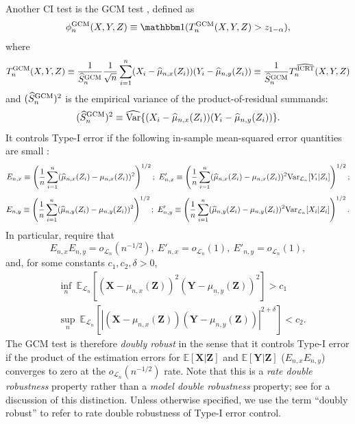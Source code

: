 \documentclass[aos]{imsart}
\theoremstyle{plain}
\theoremstyle{remark}
\newcommand{\E}{\mathbb E}								%
\newcommand{\V}{\mathrm{Var}}							%
\newcommand{\indicator}{\mathbbm 1}						%
\newcommand{\prx}{\bm X}								%
\newcommand{\srx}{X}									%
\newcommand{\prz}{\bm Z}								%
\newcommand{\srz}{Z}									%
\newcommand{\pry}{{\bm Y}}								%
\newcommand{\sry}{Y}									%
\newcommand{\law}{\mathcal L}							%
\newcommand{\GCM}{\textnormal{GCM}}						%
\newcommand{\dCRThat}{\widehat{\textnormal{dCRT}}}		%
\begin{document}
Another CI test is the GCM test \citep{Shah2018}, defined as
\begin{equation}
    \phi_n^{\GCM}(\srx, \sry, \srz) \equiv \indicator(T_n^{\GCM}(\srx, \sry, \srz) > z_{1-\alpha}),
    \label{eq:gcm-test}
\end{equation}
where
\begin{equation}
    T_n^{\GCM}(\srx, \sry, \srz) \equiv \frac{1}{\widehat S_{n}^{\GCM}}\frac{1}{\sqrt{n}}\sum_{i = 1}^n (\srx_i - \widehat \mu_{n,x}(\srz_i))(\sry_i - \widehat \mu_{n,y}(\srz_i)) \equiv \frac{1}{\widehat S_{n}^{\GCM}}T_n^{\dCRThat}(\srx, \sry, \srz)
\end{equation}
and $(\widehat S_{n}^{\GCM})^2$ is the empirical variance of the product-of-residual summands:
\begin{equation}
    (\widehat S_{n}^{\GCM})^2 \equiv \widehat{\V}\{(\srx_i - \widehat \mu_{n,x}(\srz_i))(\sry_i - \widehat \mu_{n,y}(\srz_i))\}.
\end{equation}
It controls Type-I error if the following in-sample mean-squared error quantities are small \citep{Shah2018}:
\small
\begin{equation*}
    E_{n, x} \equiv \left(\frac{1}{n}\sum_{i = 1}^n (\widehat \mu_{n,x}(\srz_i) -  \mu_{n,x}(\srz_i))^2\right)^{1/2};\ E'_{n, x} \equiv \left(\frac{1}{n}\sum_{i = 1}^n (\widehat \mu_{n,x}(\srz_i) -  \mu_{n,x}(\srz_i))^2\textnormal{Var}_{\law_n}[\sry_i|\srz_i]\right)^{1/2};
\end{equation*}	
\begin{equation*}
    E_{n, y} \equiv \left(\frac{1}{n}\sum_{i = 1}^n (\widehat \mu_{n,y}(\srz_i) -  \mu_{n,y}(\srz_i))^2\right)^{1/2};\ E'_{n, y} \equiv \left(\frac{1}{n}\sum_{i = 1}^n (\widehat \mu_{n,y}(\srz_i) -  \mu_{n,y}(\srz_i))^2\textnormal{Var}_{\law_n}[\srx_i|\srz_i]\right)^{1/2}.
\end{equation*}
\normalsize
In particular, \citet{Shah2018} require that
\begin{equation}
    E_{n, x} E_{n, y}  = o_{\law_n}(n^{-1/2}),\  E'_{n, x} = o_{\law_n}(1),\  E'_{n, y} = o_{\law_n}(1)
    \label{eq:sp1}, \tag{SP1}
\end{equation}
and, for some constants $c_1, c_2, \delta > 0$,
\begin{equation}
    \begin{split}
        &\inf_n\ \E_{\law_n}[(\prx-\mu_{n,x}(\prz))^2(\pry-\mu_{n,y}(\prz))^2] > c_1\\
        &\sup_n\ \E_{\law_n}[|(\prx-\mu_{n,x}(\prz))(\pry-\mu_{n,y}(\prz))|^{2+\delta}] < c_2.
        \label{eq:sp2}
    \end{split}
    \tag{SP2}
\end{equation}
The GCM test is therefore \textit{doubly robust} in the sense that it controls Type-I error if the product of the estimation errors for $\E[\prx|\prz]$ and $\E[\pry|\prz]$ ($E_{n,x}E_{n,y}$) converges to zero at the $o_{\law_n}(n^{-1/2})$ rate. Note that this is a \textit{rate double robustness} property rather than a \textit{model double robustness} property; see \citet{Smucler2019} for a discussion of this distinction. Unless otherwise specified, we use the term ``doubly robust'' to refer to rate double robustness of Type-I error control.
\end{document}
